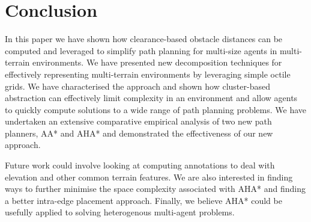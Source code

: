 \section{Conclusion}
In this paper we have shown how clearance-based obstacle distances can be computed and leveraged to simplify path planning for multi-size agents in multi-terrain environments. 
We have presented new decomposition techniques for effectively representing multi-terrain environments by leveraging simple octile grids.
We have characterised the approach and shown how cluster-based abstraction can effectively limit complexity in an environment and allow agents to quickly compute solutions to a wide range of path planning problems. 
We have undertaken an extensive comparative empirical analysis of two new path planners, AA* and AHA* and demonstrated the effectiveness of our new approach. 
\par \indent
Future work could involve looking at computing annotations to deal with elevation and other common terrain features. We are also interested in finding ways to further minimise the space complexity associated with AHA* and finding a better intra-edge placement approach. Finally, we believe AHA* could be usefully applied to solving heterogenous multi-agent problems.
